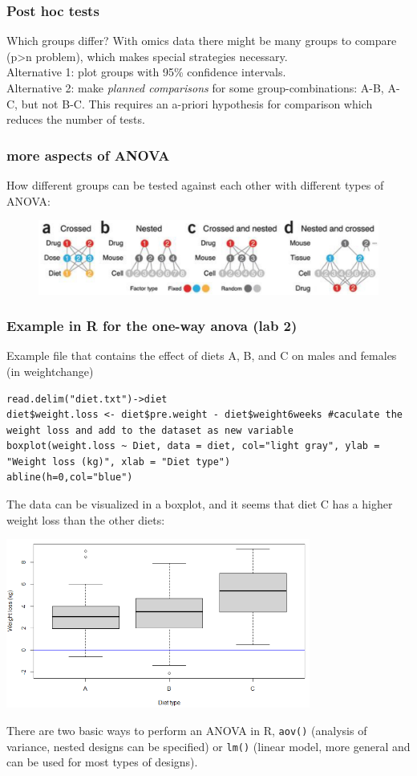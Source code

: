 \documentclass{article}
\begin{document}
\subsubsection{Post hoc tests}
Which groups differ? With omics data there might be many groups to compare (p>n problem), which makes special strategies necessary.\\
Alternative 1: plot groups with 95\% confidence intervals.\\
Alternative 2: make \textit{planned comparisons} for some group-combinations: A-B, A-C, but not B-C. This requires an a-priori hypothesis for comparison which reduces the number of tests.

\subsubsection{more aspects of ANOVA}
How different groups can be tested against each other with different types of ANOVA:
\begin{figure}[h]
    \centering
    \includegraphics[width = 1\textwidth]{ANOVA/anovakinds.jpg}
\end{figure}

\subsubsection{Example in R for the one-way anova (lab 2)}
Example file that contains the effect of diets A, B, and C on males and females (in weightchange)
\begin{lstlisting}
read.delim("diet.txt")->diet
diet$weight.loss <- diet$pre.weight - diet$weight6weeks #caculate the weight loss and add to the dataset as new variable
boxplot(weight.loss ~ Diet, data = diet, col="light gray", ylab = "Weight loss (kg)", xlab = "Diet type")
abline(h=0,col="blue")
\end{lstlisting}
The data can be visualized in a boxplot, and it seems that diet C has a higher weight loss than the other diets:
\begin{center}
    \includegraphics[width = 0.75\textwidth]{lab2/lab2_boxplot.png}
\end{center}
There are two basic ways to perform an ANOVA in R, \texttt{aov()} (analysis of variance, nested designs can be specified) or \texttt{lm()} (linear model, more general and can be used for most types of designs).
\end{document}
